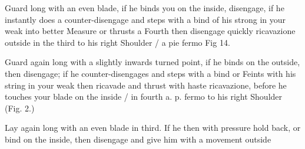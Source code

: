 Guard long with an even blade, if he binds you on the inside, disengage, if he instantly does a counter-disengage and steps with a bind of his strong in your weak into better Measure or thrusts a Fourth then disengage quickly ricavazione outside in the third to his right Shoulder / a pie fermo Fig 14.


\exercise{}
Guard again long with a slightly inwards turned point, if he binds on
the outside, then disengage; if he counter-disengages and steps with a
bind or Feints with his string in your weak then ricavade and thrust
with haste ricavazione, before he touches your blade on the inside /
in fourth a. p. fermo to his right Shoulder (Fig. 2.)

\exercise{}
Lay again long with an even blade in third. If he then with pressure
hold back, or bind on the inside, then disengage and give him with a
movement outside
